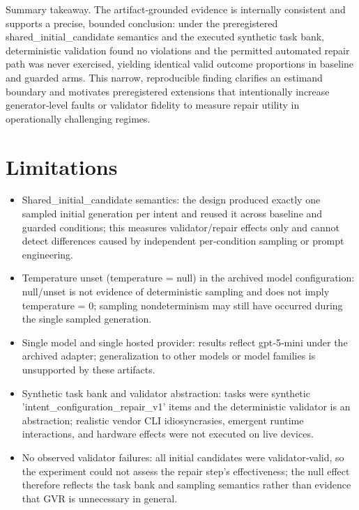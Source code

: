 \documentclass[conference]{IEEEtran}
\begin{document}
Summary takeaway. The artifact‑grounded evidence is internally consistent and supports a precise, bounded conclusion: under the preregistered shared\_initial\_candidate semantics and the executed synthetic task bank, deterministic validation found no violations and the permitted automated repair path was never exercised, yielding identical valid outcome proportions in baseline and guarded arms. This narrow, reproducible finding clarifies an estimand boundary and motivates preregistered extensions that intentionally increase generator‑level faults or validator fidelity to measure repair utility in operationally challenging regimes.

\section{Limitations}
\begin{itemize}
\item Shared\_initial\_candidate semantics: the design produced exactly one sampled initial generation per intent and reused it across baseline and guarded conditions; this measures validator/repair effects only and cannot detect differences caused by independent per‑condition sampling or prompt engineering.
\item Temperature unset (temperature = null) in the archived model configuration: null/unset is not evidence of deterministic sampling and does not imply temperature = 0; sampling nondeterminism may still have occurred during the single sampled generation.
\item Single model and single hosted provider: results reflect gpt‑5‑mini under the archived adapter; generalization to other models or model families is unsupported by these artifacts.
\item Synthetic task bank and validator abstraction: tasks were synthetic 'intent\_configuration\_repair\_v1' items and the deterministic validator is an abstraction; realistic vendor CLI idiosyncrasies, emergent runtime interactions, and hardware effects were not executed on live devices.
\item No observed validator failures: all initial candidates were validator‑valid, so the experiment could not assess the repair step's effectiveness; the null effect therefore reflects the task bank and sampling semantics rather than evidence that GVR is unnecessary in general.
\end{itemize}
\end{document}
